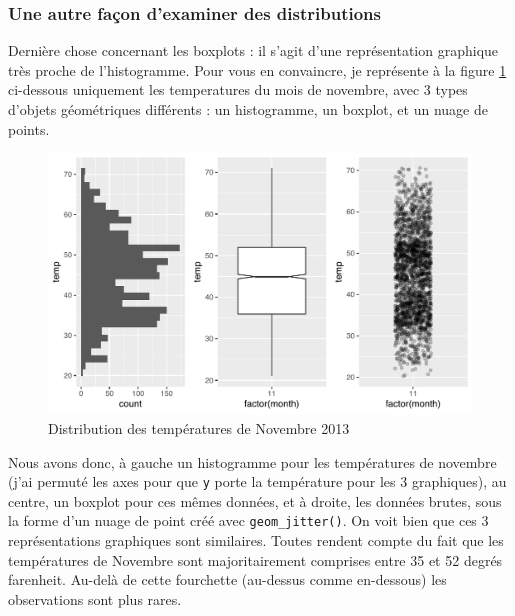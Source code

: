 \documentclass[a4paperpaper,]{article}
\theoremstyle{definition}
\theoremstyle{definition}
\theoremstyle{definition}
\theoremstyle{remark}
\begin{document}
\hypertarget{une-autre-facon-dexaminer-des-distributions}{%
\subsubsection{Une autre façon d'examiner des
distributions}\label{une-autre-facon-dexaminer-des-distributions}}

Dernière chose concernant les boxplots : il s'agit d'une représentation
graphique très proche de l'histogramme. Pour vous en convaincre, je
représente à la figure \ref{fig:compboxplot} ci-dessous uniquement les
temperatures du mois de novembre, avec 3 types d'objets géométriques
différents : un histogramme, un boxplot, et un nuage de points.

\begin{figure}[htpb]

{\centering \includegraphics[width=0.9\linewidth]{figure/compboxplot-1} 

}

\caption{Distribution des températures de Novembre 2013}\label{fig:compboxplot}
\end{figure}

Nous avons donc, à gauche un histogramme pour les températures de
novembre (j'ai permuté les axes pour que \texttt{y} porte la température
pour les 3 graphiques), au centre, un boxplot pour ces mêmes données, et
à droite, les données brutes, sous la forme d'un nuage de point créé
avec \texttt{geom\_jitter()}. On voit bien que ces 3 représentations
graphiques sont similaires. Toutes rendent compte du fait que les
températures de Novembre sont majoritairement comprises entre 35 et 52
degrés farenheit. Au-delà de cette fourchette (au-dessus comme
en-dessous) les observations sont plus rares.
\end{document}
